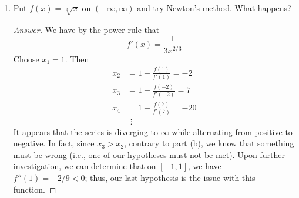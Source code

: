 \documentclass[../psets.tex]{subfiles}
\begin{document}
\begin{enumerate}[label={\textbf{\arabic*.}}]
\begin{enumerate}
\begin{proof}
\begin{align*}
                &= \frac{f(x)f''(x)}{f'(x)^2}\\
                &\leq \frac{M}{\delta^2}f(x)
            \end{align*}
            Thus, since $f(x)\to 0$ as $x\to\xi$, $g'(x)\to 0$ as $x\to\xi$.
        \end{proof}
        \item Put $f(x)=\sqrt[3]{x}$ on $(-\infty,\infty)$ and try Newton's method. What happens?
        \begin{proof}[Answer]
            We have by the power rule that
            \begin{equation*}
                f'(x) = \frac{1}{3x^{2/3}}
            \end{equation*}
            Choose $x_1=1$. Then
            \begin{align*}
                x_2 &= 1-\frac{f(1)}{f'(1)} = -2\\
                x_3 &= 1-\frac{f(-2)}{f'(-2)} = 7\\
                x_4 &= 1-\frac{f(7)}{f'(7)} = -20\\
                &\hspace{5pt}\vdots
            \end{align*}
            It appears that the series is diverging to $\infty$ while alternating from positive to negative. In fact, since $x_3>x_2$, contrary to part (b), we know that something must be wrong (i.e., one of our hypotheses must not be met). Upon further investigation, we can determine that on $[-1,1]$, we have $f''(1)=-2/9<0$; thus, our last hypothesis is the issue with this function.
        \end{proof}
    \end{enumerate}
\end{enumerate}
\end{document}
